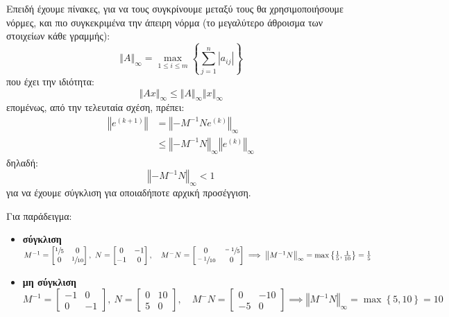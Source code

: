 \documentclass[11pt,a4paper,notitlepage,fleqn]{article}
\begin{document}
Επειδή έχουμε πίνακες, για να τους συγκρίνουμε μεταξύ τους θα
χρησιμοποιήσουμε νόρμες, και πιο συγκεκριμένα την άπειρη νόρμα
(το μεγαλύτερο άθροισμα των στοιχείων κάθε γραμμής):
\[
\left\Vert A \right\Vert_{\infty}
= \max_{1\leq i \leq m} \left\lbrace \sum_{j=1}^{n} 
\left|a_{ij}\right| \right\rbrace
\]
που έχει την ιδιότητα:
\[
\left\Vert Ax \right\Vert_{\infty} \leq \Vert A \Vert_{\infty}
\Vert x \Vert_{\infty}
\]
επομένως, από την τελευταία σχέση, πρέπει:
\begin{align*}
	\left\Vert e^{(k+1)} \right\Vert &=
	\left\Vert -M^{-1}Ne^{(k)} \right\Vert_{\infty}
	\\ &\leq \left\Vert -M^{-1}N \right\Vert_{\infty}
	\left\Vert e^{(k)} \right\Vert_{\infty}
\end{align*}
δηλαδή:
\[
\left\Vert -M^{-1}N\right\Vert_{\infty} < 1
\]
για να έχουμε σύγκλιση για οποιαδήποτε αρχική προσέγγιση.

Για παράδειγμα:
\begin{itemize}
	\item \textbf{σύγκλιση} \( 
	M^{-1} = \left[\begin{matrix}
	\sfrac{1}{5} & 0 \\
	0 & \sfrac{1}{10} 
	\end{matrix}\right],\ N = \left[\begin{matrix}
	0&-1\\-1&0
	\end{matrix}\right],
	\quad M^{-}N = \left[\begin{matrix}
	0 & \sfrac{-1}{5} \\ \sfrac{-1}{10} & 0
	\end{matrix}\right] \implies
	\left\Vert M^{-1}N\right\Vert_{\infty} = \max \left\lbrace 
	\frac{1}{5},\frac{1}{10} \right\rbrace = \frac{1}{5}
	 \)
	\item \textbf{μη σύγκλιση} \( 
	M^{-1} = \left[\begin{matrix}
	-1 & 0 \\
	0 & -1
	\end{matrix}\right],\ N = \left[\begin{matrix}
	0&10\\5&0
	\end{matrix}\right],
	\quad M^{-}N = \left[\begin{matrix}
	0 & -10 \\ -5 & 0
	\end{matrix}\right] \implies
	\left\Vert M^{-1}N\right\Vert_{\infty} = \max \left\lbrace 
	5,10 \right\rbrace = 10
	\)
\end{itemize}
\end{document}
